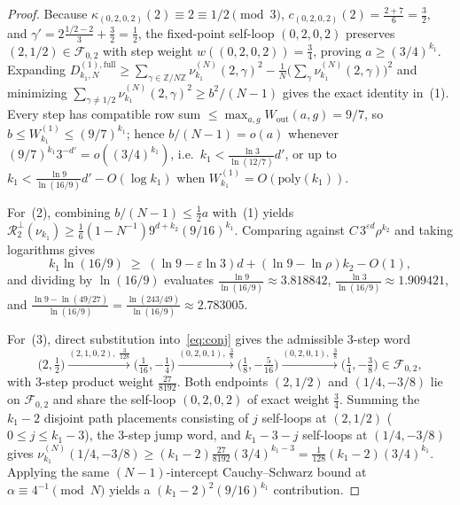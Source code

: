\documentclass[11pt,a4paper]{article}
\numberwithin{equation}{section}
\theoremstyle{definition}
\theoremstyle{remark}
\newcommand{\Z}{\mathbb{Z}}
\newcommand{\cF}{\mathcal{F}}
\begin{document}
\begin{proof}
Because $\kappa_{(0,2,0,2)}(2) \equiv 2 \equiv 1/2 \pmod 3$, $c_{(0,2,0,2)}(2) = \frac{2+7}{6} = \frac{3}{2}$, and $\gamma' = 2\frac{1/2 - 2}{3} + \frac{3}{2} = \frac{1}{2}$, the fixed-point self-loop $(0,2,0,2)$ preserves $(2, 1/2) \in \cF_{0,2}$ with step weight $w((0,2,0,2)) = \frac{3}{4}$, proving $a \ge (3/4)^{k_1}$. Expanding $D_{k_1, N}^{(1), \mathrm{full}} \ge \sum_{\gamma \in \Z/N\Z} \nu_{k_1}^{(N)}(2, \gamma)^2 - \frac{1}{N}\bigl(\sum_\gamma \nu_{k_1}^{(N)}(2, \gamma)\bigr)^2$ and minimizing $\sum_{\gamma \neq 1/2} \nu_{k_1}^{(N)}(2, \gamma)^2 \ge b^2/(N-1)$ gives the exact identity in~(1). Every step has compatible row sum $\le \max_{a,g} W_{\mathrm{out}}(a,g) = 9/7$, so $b \le W_{k_1}^{(1)} \le (9/7)^{k_1}$; hence $b/(N-1) = o(a)$ whenever $(9/7)^{k_1}3^{-d'} = o((3/4)^{k_1})$, i.e.\ $k_1 < \frac{\ln 3}{\ln(12/7)}d'$, or up to $k_1 < \frac{\ln 9}{\ln(16/9)}d' - O(\log k_1)$ when $W_{k_1}^{(1)} = O(\mathrm{poly}(k_1))$.

For~(2), combining $b/(N-1) \le \frac{1}{2}a$ with~(1) yields $\mathcal{R}_2^\perp(\nu_{k_1}) \ge \frac{1}{6}(1 - N^{-1})9^{d+k_2}(9/16)^{k_1}$. Comparing against $C\,3^{\varepsilon d}\rho^{k_2}$ and taking logarithms gives
\[
k_1 \ln(16/9) \;\ge\; (\ln 9 - \varepsilon\ln 3) d + (\ln 9 - \ln\rho) k_2 - O(1),
\]
and dividing by $\ln(16/9)$ evaluates $\frac{\ln 9}{\ln(16/9)} \approx 3.818842$, $\frac{\ln 3}{\ln(16/9)} \approx 1.909421$, and $\frac{\ln 9 - \ln(49/27)}{\ln(16/9)} = \frac{\ln(243/49)}{\ln(16/9)} \approx 2.783005$.

For~(3), direct substitution into~\eqref{eq:conj} gives the admissible $3$-step word
\[
\bigl(2, \tfrac{1}{2}\bigr) \xrightarrow{(2,1,0,2),\;\frac{3}{128}} \bigl(\tfrac{1}{16}, -\tfrac{1}{4}\bigr) \xrightarrow{(0,2,0,1),\;\frac{3}{8}} \bigl(\tfrac{1}{8}, -\tfrac{5}{16}\bigr) \xrightarrow{(0,2,0,1),\;\frac{3}{8}} \bigl(\tfrac{1}{4}, -\tfrac{3}{8}\bigr) \in \cF_{0,2},
\]
with $3$-step product weight $\frac{27}{8192}$. Both endpoints $(2, 1/2)$ and $(1/4, -3/8)$ lie on $\cF_{0,2}$ and share the self-loop $(0,2,0,2)$ of exact weight $\frac{3}{4}$. Summing the $k_1 - 2$ disjoint path placements consisting of $j$ self-loops at $(2, 1/2)$ ($0 \le j \le k_1 - 3$), the $3$-step jump word, and $k_1 - 3 - j$ self-loops at $(1/4, -3/8)$ gives $\nu_{k_1}^{(N)}(1/4, -3/8) \ge (k_1 - 2)\frac{27}{8192}(3/4)^{k_1 - 3} = \frac{1}{128}(k_1 - 2)(3/4)^{k_1}$. Applying the same $(N-1)$-intercept Cauchy--Schwarz bound at $\alpha \equiv 4^{-1} \pmod N$ yields a $(k_1 - 2)^2(9/16)^{k_1}$ contribution.
\end{proof}
\end{document}
